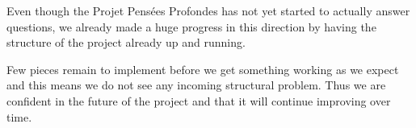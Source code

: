 Even though the Projet Pensées Profondes has not yet started to actually
answer questions, we already made a huge progress in this direction
by having the structure of the project already up and running.

Few pieces remain to implement before we get something working as we
expect and this means we do not see any incoming structural problem.
Thus we are confident in the future of the project and that it will
continue improving over time.
